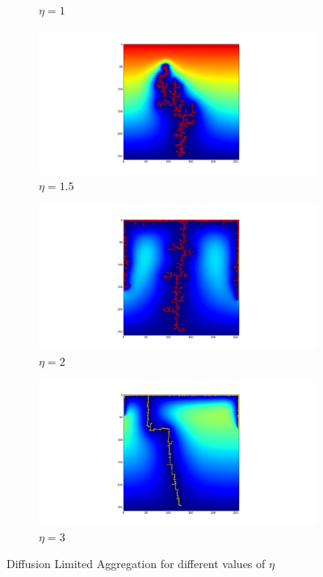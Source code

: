\documentclass[a4paper]{article}
\begin{document}
\begin{figure}[ht]
\begin{subfigure}[b]{0.5\linewidth}
    \caption{$\eta = 1$} 
    \label{fig:DLA_eta10} 
  \end{subfigure}%
  \begin{subfigure}[b]{0.5\linewidth}
    \centering
    \includegraphics[width=\linewidth, trim={7cm 1.8cm 7cm 1cm},clip]{DLA_eta15.png} 
    \caption{$\eta = 1.5$} 
    \label{fig:DLA_eta15} 
  \end{subfigure}
  \begin{subfigure}[b]{0.5\linewidth}
    \centering
    \includegraphics[width=\linewidth, trim={7cm 1.8cm 7cm 1cm},clip]{DLA_eta20.png} 
    \caption{$\eta = 2$} 
    \label{fig:DLA_eta20} 
  \end{subfigure}%
  \begin{subfigure}[b]{0.5\linewidth}
    \centering
    \includegraphics[width=\linewidth, trim={7cm 1.8cm 7cm 1cm},clip]{DLA_eta30.png} 
    \caption{$\eta = 3$} 
    \label{fig:DLA_eta30} 
  \end{subfigure}
  \caption{Diffusion Limited Aggregation for different values of $\eta$}
  \label{fig:DLA_eta} 
\end{figure}
\end{document}
